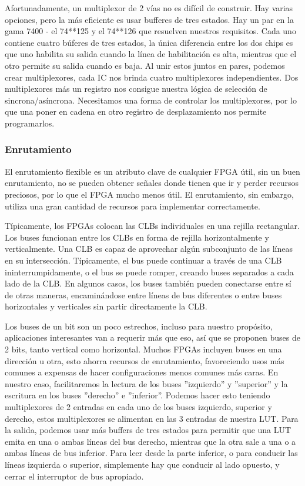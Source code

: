 \documentclass[12pt]{article}
\begin{document}
Afortunadamente, un multiplexor de 2 vías no es difícil de construir. Hay varias opciones, pero la más eficiente es usar bufferes de tres estados. Hay un par en la gama 7400 - el 74**125 y el 74**126 que resuelven nuestros requisitos. Cada uno contiene cuatro búferes de tres estados, la única diferencia entre los dos chips es que uno habilita su salida cuando la línea de habilitación es alta, mientras que el otro permite su salida cuando es baja. Al unir estos juntos en pares, podemos crear multiplexores, cada IC nos brinda cuatro multiplexores independientes. Dos multiplexores más un registro nos consigue nuestra lógica de selección de sincrona/asíncrona. Necesitamos una forma de controlar los multiplexores, por lo que una poner en cadena en otro registro de desplazamiento nos permite programarlos. 

\subsubsection{Enrutamiento}

El enrutamiento flexible es un atributo clave de cualquier FPGA útil, sin un buen enrutamiento, no se pueden obtener señales donde tienen que ir y perder recursos preciosos, por lo que el FPGA mucho menos útil. El enrutamiento, sin embargo, utiliza una gran cantidad de recursos para implementar correctamente. 
 
Típicamente, los FPGAs colocan las CLBs individuales en una rejilla rectangular. Los buses funcionan entre los CLBs en forma de rejilla horizontalmente y verticalmente. Una CLB es capaz de aprovechar algún subconjunto de las líneas en su intersección. Típicamente, el bus puede continuar a través de una CLB ininterrumpidamente, o el bus se puede romper, creando buses separados a cada lado de la CLB. En algunos casos, los buses también pueden conectarse entre sí de otras maneras, encaminándose entre líneas de bus diferentes o entre buses horizontales y verticales sin partir directamente la CLB. 
 
Los buses de un bit son un poco estrechos, incluso para nuestro propósito, aplicaciones interesantes van a requerir más que eso, así que se proponen buses de 2 bits, tanto vertical como horizontal. Muchos FPGAs incluyen buses en una dirección u otra, esto ahorra recursos de enrutamiento, favoreciendo usos más comunes a expensas de hacer configuraciones menos comunes más caras. En nuestro caso, facilitaremos la lectura de los buses ''izquierdo'' y ''superior'' y la escritura en los buses ''derecho'' e ''inferior''. Podemos hacer esto teniendo multiplexores de 2 entradas en cada uno de los buses izquierdo, superior y derecho, estos multiplexores se alimentan en las 3 entradas de nuestra LUT. Para la salida, podemos usar más buffers de tres estados para permitir que una LUT emita en una o ambas líneas del bus derecho, mientras que la otra sale a una o a ambas líneas de bus inferior. Para leer desde la parte inferior, o para conducir las líneas izquierda o superior, simplemente hay que conducir al lado opuesto, y cerrar el interruptor de bus apropiado. 
 
\end{document}
